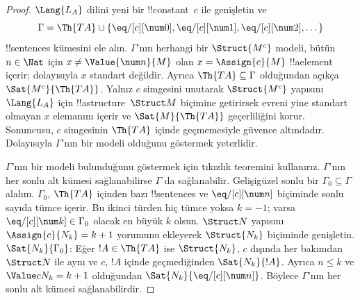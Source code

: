 \begin{proof}
$\Lang{L_A}$ dilini yeni bir !!{constant}~$c$ ile genişletin ve
\[
\Gamma=\Th{TA}\cup\{\eq/[c][\num0],\eq/[c][\num1],
\eq/[c][\num2],\dots\}
\]
!!{sentence}s kümesini ele alın. $\Gamma$'nın herhangi bir
$\Struct{M^c}$ modeli, bütün $n\in\Nat$ için
$x\neq\Value{\num n}{M}$ olan $x=\Assign{c}{M}$ !!a{element}
içerir; dolayısıyla $x$ standart değildir. Ayrıca
$\Th{TA}\subseteq\Gamma$ olduğundan açıkça
$\Sat{M^c}{\Th{TA}}$. Yalnız $c$ simgesini unutarak $\Struct{M^c}$
yapısını $\Lang{L_A}$ için !!a{structure}~$\Struct M$ biçimine
getirirsek evreni yine standart olmayan $x$ elemanını içerir ve
$\Sat{M}{\Th{TA}}$ geçerliliğini korur. Sonuncusu, $c$ simgesinin
$\Th{TA}$ içinde geçmemesiyle güvence altındadır. Dolayısıyla
$\Gamma$'nın bir modeli olduğunu göstermek yeterlidir.

$\Gamma$'nın bir modeli bulunduğunu göstermek için tıkızlık teoremini
kullanırız. $\Gamma$'nın her sonlu alt kümesi sağlanabilirse $\Gamma$
da sağlanabilir. Gelişigüzel sonlu bir $\Gamma_0\subseteq\Gamma$
alalım. $\Gamma_0$, $\Th{TA}$ içinden bazı !!{sentence}s ve
$\eq/[c][\num n]$ biçiminde sonlu sayıda tümce içerir. Bu ikinci türden
hiç tümce yoksa $k=-1$; varsa
$\eq/[c][\num k]\in\Gamma_0$ olacak en büyük $k$ olsun.
$\Struct N$ yapısını $\Assign{c}{N_k}=k+1$ yorumunu ekleyerek
$\Struct{N_k}$ biçiminde genişletin. $\Sat{N_k}{\Gamma_0}$: Eğer
$!A\in\Th{TA}$ ise $\Struct{N_k}$, $c$ dışında her bakımdan
$\Struct N$ ile aynı ve $c$, $!A$ içinde geçmediğinden
$\Sat{N_k}{!A}$. Ayrıca $n\leq k$ ve
$\Value c{N_k}=k+1$ olduğundan
$\Sat{N_k}{\eq/[c][\num n]}$. Böylece $\Gamma$'nın her sonlu alt
kümesi sağlanabilirdir.
\end{proof}

